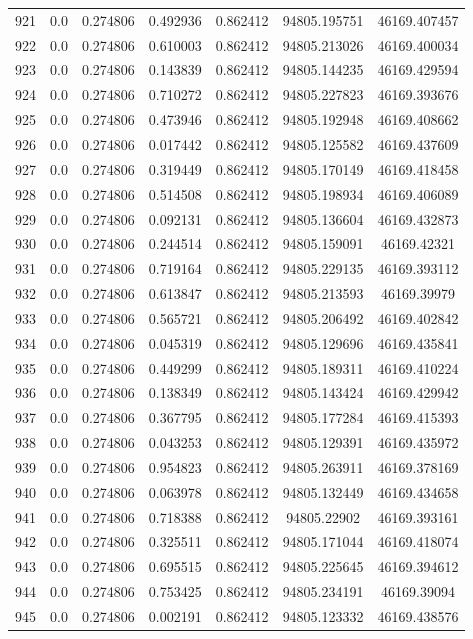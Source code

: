 \begin{table}
\begin{tabular*}{\linewidth}{c|c|c|c|c|c|c}
921 & 0.0 & 0.274806 & 0.492936 & 0.862412 & 94805.195751 & 46169.407457\\
922 & 0.0 & 0.274806 & 0.610003 & 0.862412 & 94805.213026 & 46169.400034\\
923 & 0.0 & 0.274806 & 0.143839 & 0.862412 & 94805.144235 & 46169.429594\\
924 & 0.0 & 0.274806 & 0.710272 & 0.862412 & 94805.227823 & 46169.393676\\
925 & 0.0 & 0.274806 & 0.473946 & 0.862412 & 94805.192948 & 46169.408662\\
926 & 0.0 & 0.274806 & 0.017442 & 0.862412 & 94805.125582 & 46169.437609\\
927 & 0.0 & 0.274806 & 0.319449 & 0.862412 & 94805.170149 & 46169.418458\\
928 & 0.0 & 0.274806 & 0.514508 & 0.862412 & 94805.198934 & 46169.406089\\
929 & 0.0 & 0.274806 & 0.092131 & 0.862412 & 94805.136604 & 46169.432873\\
930 & 0.0 & 0.274806 & 0.244514 & 0.862412 & 94805.159091 & 46169.42321\\
931 & 0.0 & 0.274806 & 0.719164 & 0.862412 & 94805.229135 & 46169.393112\\
932 & 0.0 & 0.274806 & 0.613847 & 0.862412 & 94805.213593 & 46169.39979\\
933 & 0.0 & 0.274806 & 0.565721 & 0.862412 & 94805.206492 & 46169.402842\\
934 & 0.0 & 0.274806 & 0.045319 & 0.862412 & 94805.129696 & 46169.435841\\
935 & 0.0 & 0.274806 & 0.449299 & 0.862412 & 94805.189311 & 46169.410224\\
936 & 0.0 & 0.274806 & 0.138349 & 0.862412 & 94805.143424 & 46169.429942\\
937 & 0.0 & 0.274806 & 0.367795 & 0.862412 & 94805.177284 & 46169.415393\\
938 & 0.0 & 0.274806 & 0.043253 & 0.862412 & 94805.129391 & 46169.435972\\
939 & 0.0 & 0.274806 & 0.954823 & 0.862412 & 94805.263911 & 46169.378169\\
940 & 0.0 & 0.274806 & 0.063978 & 0.862412 & 94805.132449 & 46169.434658\\
941 & 0.0 & 0.274806 & 0.718388 & 0.862412 & 94805.22902 & 46169.393161\\
942 & 0.0 & 0.274806 & 0.325511 & 0.862412 & 94805.171044 & 46169.418074\\
943 & 0.0 & 0.274806 & 0.695515 & 0.862412 & 94805.225645 & 46169.394612\\
944 & 0.0 & 0.274806 & 0.753425 & 0.862412 & 94805.234191 & 46169.39094\\
945 & 0.0 & 0.274806 & 0.002191 & 0.862412 & 94805.123332 & 46169.438576\\
\end{tabular*}
\end{table}
